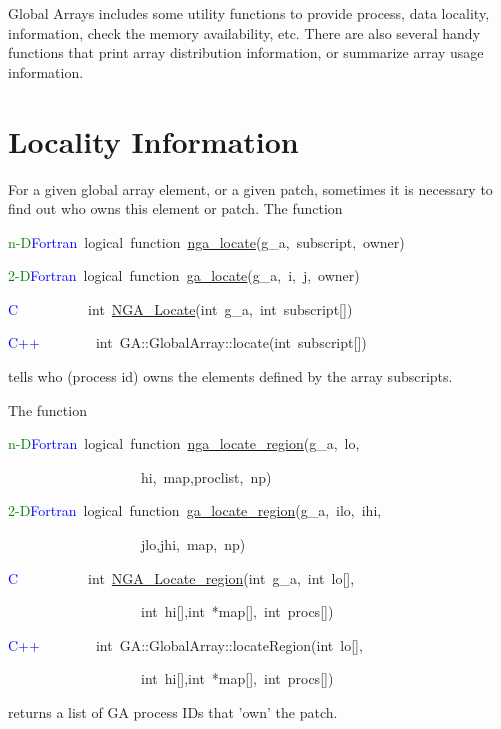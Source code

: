 Global Arrays includes some utility functions to provide process,
data locality, information, check the memory availability, etc. There
are also several handy functions that print array distribution information,
or summarize array usage information. 


\section{Locality Information}

For a given global array element, or a given patch, sometimes it is
necessary to find out who owns this element or patch. The function
\begin{lyxcode}
\textcolor{green}{n-D}\textcolor{blue}{Fortran}~logical~function~\href{http://www.emsl.pnl.gov/docs/global/ga_ops.html\#ga_locate}{nga\_{}locate}(g\_a,~subscript,~owner)~

\textcolor{green}{2-D}\textcolor{blue}{Fortran}~logical~function~\href{http://www.emsl.pnl.gov/docs/global/ga_ops.html\#ga_locate}{ga\_{}locate}(g\_a,~i,~j,~owner)~

\textcolor{blue}{C}~~~~~~~~~~int~\href{http://www.emsl.pnl.gov/docs/global/c_nga_ops.html\#ga_locate}{NGA\_{}Locate}(int~g\_a,~int~subscript{[}{]})~

\textcolor{blue}{C++}~~~~~~~~int~GA::GlobalArray::locate(int~subscript{[}{]})
\end{lyxcode}
tells who (process id) owns the elements defined by the array subscripts.

The function
\begin{lyxcode}
\textcolor{green}{n-D}\textcolor{blue}{Fortran}~logical~function~\href{http://www.emsl.pnl.gov/docs/global/ga_ops.html\#ga_locate_region}{nga\_{}locate\_{}region}(g\_a,~lo,~

~~~~~~~~~~~~~~~~~~~hi,~map,proclist,~np)~

\textcolor{green}{2-D}\textcolor{blue}{Fortran}~logical~function~\href{http://www.emsl.pnl.gov/docs/global/c_nga_ops.html\#ga_locate_region}{ga\_{}locate\_{}region}(g\_a,~ilo,~ihi,~

~~~~~~~~~~~~~~~~~~~jlo,jhi,~map,~np)~

\textcolor{blue}{C}~~~~~~~~~~int~\href{http://www.emsl.pnl.gov/docs/global/c_nga_ops.html\#ga_locate_region}{NGA\_{}Locate\_{}region}(int~g\_a,~int~lo{[}{]},~

~~~~~~~~~~~~~~~~~~~int~hi{[}{]},int~{*}map{[}{]},~int~procs{[}{]})~

\textcolor{blue}{C++}~~~~~~~~int~GA::GlobalArray::locateRegion(int~lo{[}{]},~

~~~~~~~~~~~~~~~~~~~int~hi{[}{]},int~{*}map{[}{]},~int~procs{[}{]})
\end{lyxcode}
returns a list of GA process IDs that 'own' the patch.

